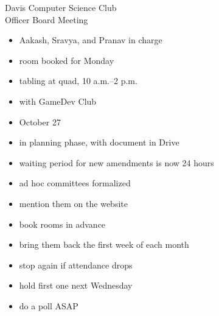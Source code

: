 \documentclass{article}
\begin{document}
\begin{Minutes}{Davis Computer Science Club\\Officer Board Meeting}
\begin{itemize}
\item Aakash, Sravya, and Pranav in charge
\end{itemize}
\begin{itemize}
\item room booked for Monday
\end{itemize}
\begin{itemize}
\item tabling at quad, 10 a.m.--2 p.m.
\item with GameDev Club
\end{itemize}
\begin{itemize}
\item October 27
\item in planning phase, with document in Drive
\end{itemize}

\begin{itemize}
\item waiting period for new amendments is now 24 hours
\item ad hoc committees formalized
\end{itemize}

\begin{itemize}
\item mention them on the website
\item book rooms in advance
\end{itemize}
\begin{itemize}
\item bring them back the first week of each month
\item stop again if attendance drops
\item hold first one next Wednesday
\item do a poll ASAP
\end{itemize}
\thispagestyle{creditfooter}
\end{Minutes}
\end{document}
